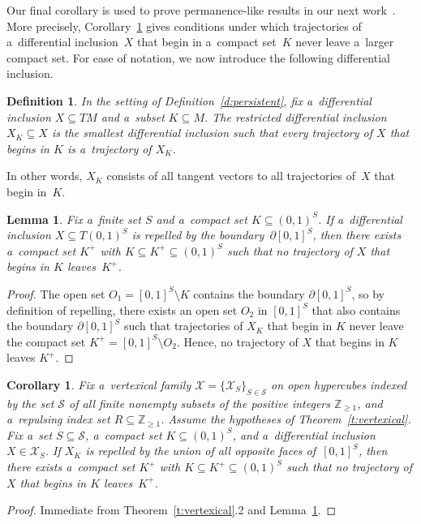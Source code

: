 \documentclass[pdftex]{sigma}
\newtheorem{Corollary}[Theorem]{Corollary}
\newtheorem{Lemma}[Theorem]{Lemma}
\newtheorem{Definition}[Theorem]{Definition}
\begin{document}
Our f\/inal corollary is used to prove permanence-like results in our next work~\cite{GeoGAC}.
More precisely, Corollary~\ref{c:bounded} gives conditions under which trajectories of a~dif\/ferential inclusion~$X$
that begin in a~compact set~$K$ never leave a~larger compact set.
For ease of notation, we now introduce the following dif\/ferential inclusion.
\begin{Definition}
\label{d:restK}
In the setting of Def\/inition~\ref{d:persistent}, f\/ix a~dif\/ferential inclusion $X\subseteq TM$ and a~subset
$K\subseteq M$.
The \emph{restricted differential inclusion} $X_K\subseteq X$ is the smallest dif\/ferential inclusion such that
every trajectory of $X$ that begins in $K$ is a~trajectory of $X_K$.
\end{Definition}

In other words, $X_K$ consists of all tangent vectors to all trajectories of~$X$ that begin in~$K$.
\begin{Lemma}
\label{l:bounded}
Fix a~finite set $S$ and a~compact set $K\subseteq(0,1)^S$.
If a~differential inclusion $X\subseteq T(0,1)^S$ is repelled by the boundary~$\partial[0,1]^S$, then there exists
a~compact set $K^+$ with $K\subseteq K^+\subseteq(0,1)^S$ such that no trajectory of $X$ that begins in $K$ leaves~$K^+$.
\end{Lemma}
\begin{proof}
The open set $O_1=[0,1]^S\setminus K$ contains the boundary $\partial[0,1]^S$, so by def\/inition of repelling, there
exists an open set $O_2$ in $[0,1]^S$ that also contains the boundary $\partial[0,1]^S$ such that trajectories of $X_K$
that begin in $K$ never leave the compact set $K^+=[0,1]^S\setminus O_2$.
Hence, no trajectory of $X$ that begins in $K$ leaves $K^+$.
\end{proof}

\begin{Corollary}
\label{c:bounded}
Fix a~vertexical family $\mathcal X=\{\mathcal X_S\}_{S\in\mathcal S}$ on open hypercubes indexed by the set $\mathcal
S$ of all finite nonempty subsets of the positive integers $\mathbb{Z}_{\geq1}$, and a~repulsing index set
$R\subseteq\mathbb{Z}_{\geq1}$.
Assume the hypotheses of Theorem~{\rm \ref{t:vertexical}}.
Fix a~set $S\subseteq\mathcal S$, a~compact set $K\subseteq(0,1)^S$, and a~differential inclusion $X\in\mathcal X_S$.
If $X_K$ is repelled by the union of all opposite faces of\/~$[0,1]^S$, then there exists a~compact set $K^+$ with
$K\subseteq K^+\subseteq(0,1)^S$ such that no trajectory of $X$ that begins in $K$ leaves~$K^+$.
\end{Corollary}
\begin{proof}
Immediate from Theorem~\ref{t:vertexical}.2 and Lemma~\ref{l:bounded}.
\end{proof}
\end{document}
